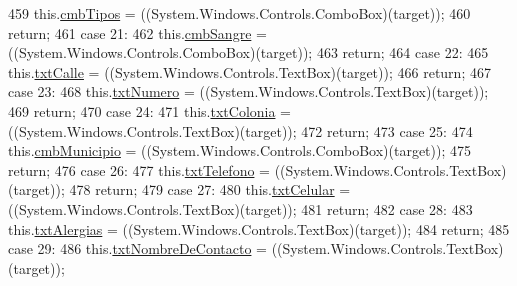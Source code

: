 \begin{DoxyCode}
459             this.\hyperlink{class_proyecto___integrador__3_1_1_main_window_a6ffda9fa41aae566606ef782be37ed11}{cmbTipos} = ((System.Windows.Controls.ComboBox)(target));
460             \textcolor{keywordflow}{return};
461             \textcolor{keywordflow}{case} 21:
462             this.\hyperlink{class_proyecto___integrador__3_1_1_main_window_a78f29679759491825a6a30ad89e8a867}{cmbSangre} = ((System.Windows.Controls.ComboBox)(target));
463             \textcolor{keywordflow}{return};
464             \textcolor{keywordflow}{case} 22:
465             this.\hyperlink{class_proyecto___integrador__3_1_1_main_window_afbbf986bc8047e3cade1e2ab50a1402c}{txtCalle} = ((System.Windows.Controls.TextBox)(target));
466             \textcolor{keywordflow}{return};
467             \textcolor{keywordflow}{case} 23:
468             this.\hyperlink{class_proyecto___integrador__3_1_1_main_window_aa5f2bae20c9397b7c6ea3926afebd5ce}{txtNumero} = ((System.Windows.Controls.TextBox)(target));
469             \textcolor{keywordflow}{return};
470             \textcolor{keywordflow}{case} 24:
471             this.\hyperlink{class_proyecto___integrador__3_1_1_main_window_a3c03dcfb84d69ba923dcc7d54d98c569}{txtColonia} = ((System.Windows.Controls.TextBox)(target));
472             \textcolor{keywordflow}{return};
473             \textcolor{keywordflow}{case} 25:
474             this.\hyperlink{class_proyecto___integrador__3_1_1_main_window_a6fad73b5f18398cb423384f61d36ff9a}{cmbMunicipio} = ((System.Windows.Controls.ComboBox)(target));
475             \textcolor{keywordflow}{return};
476             \textcolor{keywordflow}{case} 26:
477             this.\hyperlink{class_proyecto___integrador__3_1_1_main_window_a3d79de440d7968c622d331dd467c8987}{txtTelefono} = ((System.Windows.Controls.TextBox)(target));
478             \textcolor{keywordflow}{return};
479             \textcolor{keywordflow}{case} 27:
480             this.\hyperlink{class_proyecto___integrador__3_1_1_main_window_ac9cc63316a297453b50f4b8704503109}{txtCelular} = ((System.Windows.Controls.TextBox)(target));
481             \textcolor{keywordflow}{return};
482             \textcolor{keywordflow}{case} 28:
483             this.\hyperlink{class_proyecto___integrador__3_1_1_main_window_a4aae2b3a933df894d92ec27f865332e9}{txtAlergias} = ((System.Windows.Controls.TextBox)(target));
484             \textcolor{keywordflow}{return};
485             \textcolor{keywordflow}{case} 29:
486             this.\hyperlink{class_proyecto___integrador__3_1_1_main_window_afe7d51ab07d58ba85a31a58fce6f7d34}{txtNombreDeContacto} = ((System.Windows.Controls.TextBox)(target));

\end{DoxyCode}

